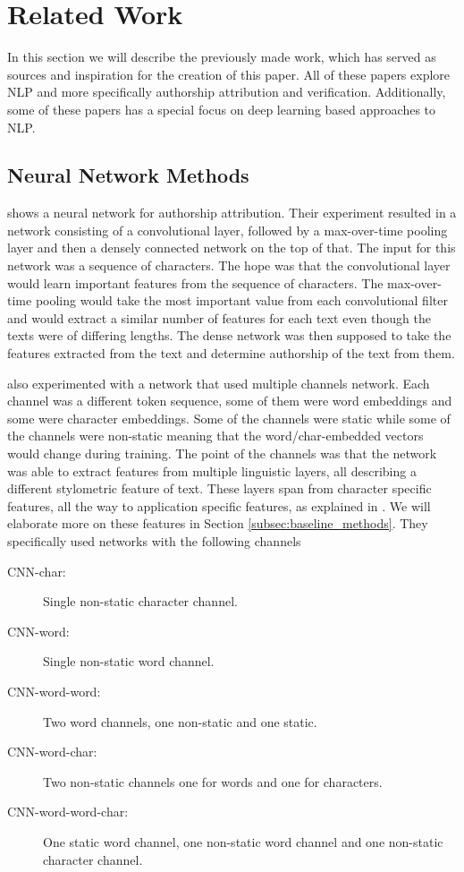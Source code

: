 \section{Related Work} \label{sec:related_work}


In this section we will describe the previously made work,
which has served as sources and inspiration for the creation of this paper.
All of these papers explore \gls{NLP} and more specifically authorship
attribution and verification. Additionally, some of these papers has a
special focus on deep learning based approaches to \gls{NLP}.

\subsection{Neural Network Methods}

\citet{DBLP:journals/corr/RuderGB16c} shows a neural network for authorship
attribution. Their experiment resulted in a network consisting of a
convolutional layer, followed by a max-over-time pooling layer and then a
densely connected network on the top of that. The input for this network was a
sequence of characters. The hope was that the convolutional layer would learn
important features from the sequence of characters. The max-over-time pooling
would take the most important value from each convolutional filter and would
extract a similar number of features for each text even though the texts were
of differing lengths. The dense network was then supposed to take the features
extracted from the text and determine authorship of the text from them.

\citet{DBLP:journals/corr/RuderGB16c} also experimented with a network that
used multiple channels network. Each channel was a different token sequence,
some of them were word embeddings and some were character embeddings. Some of
the channels were static while some of the channels were non-static meaning
that the word/char-embedded vectors would change during training. The point of
the channels was that the network was able to extract features from multiple
linguistic layers, all describing a different stylometric feature of text.
These layers span from character specific features, all the way to application
specific features, as explained in \citet[Section 2]{stamatos2009}. We will
elaborate more on these features in Section \ref{subsec:baseline_methods}. They
specifically used networks with the following channels

\begin{description}
    \item[CNN-char:] Single non-static character channel.
    \item[CNN-word:] Single non-static word channel.
    \item[CNN-word-word:] Two word channels, one non-static and one static.
    \item[CNN-word-char:] Two non-static channels one for words and one for
        characters.
    \item[CNN-word-word-char:] One static word channel, one non-static word
        channel and one non-static character channel.
\end{description}

